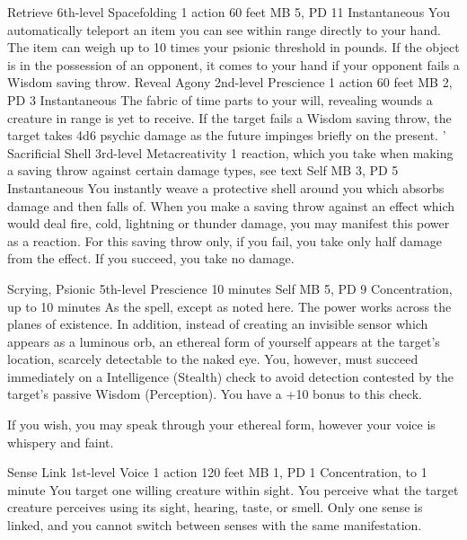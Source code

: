 \DndPowerHeader%
    {Retrieve\label{pwr:retrieve}}
    {6th-level Spacefolding}
    {1 action}
    {60 feet}
    {MB 5, PD 11}
    {Instantaneous}
You automatically teleport an item you can
see within range directly to your hand. The item can weigh
up to 10 times your psionic threshold in pounds. If the object
is in the possession of an opponent, it comes to your hand
if your opponent fails a Wisdom saving throw.
\DndPowerHeader%
    {Reveal Agony\label{pwr:reveal_agony}}
    {2nd-level Prescience}
    {1 action}
    {60 feet}
    {MB 2, PD 3}
    {Instantaneous}
The fabric of time parts to your will, revealing
wounds a creature in range is yet to receive. If the target
fails a Wisdom saving throw, the target takes 4d6 psychic
damage as the future impinges briefly on the present. '
\DndPowerHeader%
    {Sacrificial Shell\label{pwr:sacrificial_shell}}
    {3rd-level Metacreativity}
    {1 reaction, which you take when making a saving throw against certain damage types, see text}
    {Self}
    {MB 3, PD 5}
    {Instantaneous}
You instantly weave a protective shell around
you which absorbs damage and then falls of. When you make
a saving throw against an effect which would deal fire, cold,
lightning or thunder damage, you may manifest this power as
a reaction. For this saving throw only, if you fail, you take
only half damage from the effect. If you succeed, you take
no damage.

\DndPowerHeader%
    {Scrying, Psionic\label{pwr:scrying_psionic}}
    {5th-level Prescience}
    {10 minutes}
    {Self}
    {MB 5, PD 9}
    {Concentration, up to 10 minutes}
As the  spell, except as noted
here. The power works across the planes of existence. In addition,
instead of creating an invisible sensor which appears as a
luminous orb, an ethereal form of yourself appears at the
target's location, scarcely detectable to the naked eye.
You, however, must succeed immediately on a Intelligence (Stealth)
check to avoid detection contested by the target's passive
Wisdom (Perception). You have a +10 bonus to this check.

If you wish, you may speak through your ethereal form, however
your voice is whispery and faint.

\DndPowerHeader%
    {Sense Link\label{pwr:sense_link}}
    {1st-level Voice}
    {1 action}
    {120 feet}
    {MB 1, PD 1}
    {Concentration, to 1 minute}
You target one willing creature within sight.
You perceive what the target creature perceives using its
sight, hearing, taste, or smell. Only one sense is linked,
and you cannot switch between senses with the same manifestation.

